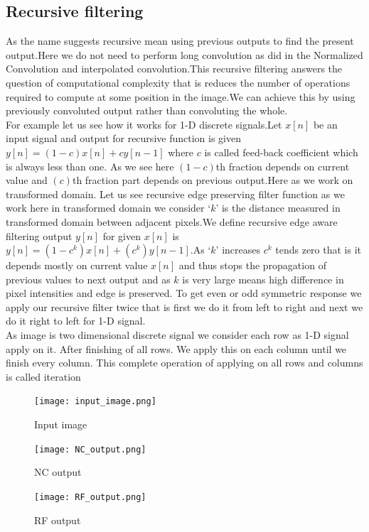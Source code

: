 \documentclass[conference]{IEEEtran}
\begin{document}
  \subsection{Recursive filtering}
  	As the name suggests recursive mean using previous outputs to find the present output.Here we do not need to perform long convolution as did in the Normalized Convolution and interpolated convolution.This recursive filtering answers the question of computational complexity that is reduces the number of operations required to compute at some position in the image.We can achieve this by using previously convoluted output rather than convoluting the whole.\\
  	 For example let us see how it works for 1-D discrete signals.Let $x[n]$ be an input signal and output for recursive function is given $y[n] = (1-c)x[n] + cy[n-1]$ where $c$ is called feed-back coefficient which is always less than one. As we see here $(1-c)$th fraction depends on current value and $(c)$th fraction part depends on previous output.Here as we work on transformed domain. 
Let us see recursive edge preserving filter function as we work here in transformed domain we consider ‘$k$’ is the distance measured in transformed domain between adjacent pixels.We define recursive edge aware filtering output $y[n]$ for given $x[n]$ is $y[n] = (1-c^k)x[n]+(c^k)y[n-1]$.As ‘$k$’ increases $c^k$ tends zero that is it depends mostly on current value $x[n]$ and thus stops the propagation of previous values to next output and  as $k$ is very large means high difference in pixel intensities and edge is preserved. To get even or odd symmetric response we apply our recursive filter twice that is first we do it from left to right and next we do it right to left for 1-D signal. \\
	As image is two dimensional discrete signal we consider each row as 1-D signal apply on it. After finishing of all rows. We apply this on each column until we finish every column. This complete operation of applying on all rows and columns is called iteration


\begin{figure}[h]
 	\texttt{[image: input\_image.png]}
 	\caption{Input image}
 \end{figure}
 
 \begin{figure}[h]
 	\texttt{[image: NC\_output.png]}
 	\caption{NC output}
 \end{figure}
 
 \begin{figure}[h]
 	\texttt{[image: RF\_output.png]}
 	\caption{RF output}
 \end{figure}
 
\end{document}
